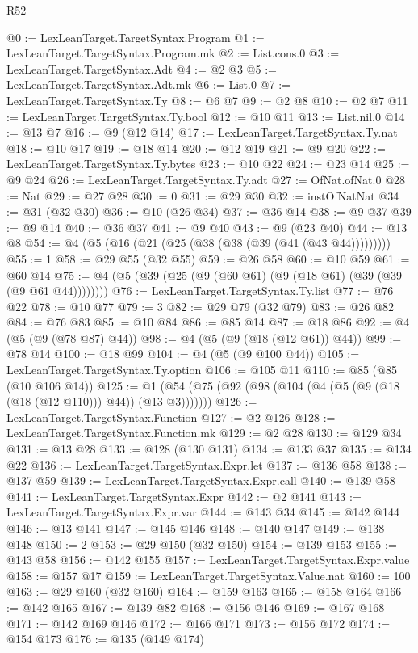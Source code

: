 \begin{lexlean}{R52}
\begin{coremodule}
{{{{{{{{{{{{{{{{{{{{{{{{{{{{{{{{{{{{{{{{{{{{{{{{{{{{{{{{{{{{{{{{{{{{{{{{{{{{{{{{{{{{{{{{{{{{{{{{{{{{{{{{{{{{{{{{{{{{{{{{{{{{{{{{{{{{{{{{{{{{{{{{{{{{{{{{{{{{{{{{{{{{{{{{{{{{{{{{{{{{{{{{{{{{{{{{{{{{{{@0 := LexLeanTarget.TargetSyntax.Program
@1 := LexLeanTarget.TargetSyntax.Program.mk
@2 := List.cons.{0}
@3 := LexLeanTarget.TargetSyntax.Adt
@4 := @2 @3
@5 := LexLeanTarget.TargetSyntax.Adt.mk
@6 := List.{0}
@7 := LexLeanTarget.TargetSyntax.Ty
@8 := @6 @7
@9 := @2 @8
@10 := @2 @7
@11 := LexLeanTarget.TargetSyntax.Ty.bool
@12 := @10 @11
@13 := List.nil.{0}
@14 := @13 @7
@16 := @9 (@12 @14)
@17 := LexLeanTarget.TargetSyntax.Ty.nat
@18 := @10 @17
@19 := @18 @14
@20 := @12 @19
@21 := @9 @20
@22 := LexLeanTarget.TargetSyntax.Ty.bytes
@23 := @10 @22
@24 := @23 @14
@25 := @9 @24
@26 := LexLeanTarget.TargetSyntax.Ty.adt
@27 := OfNat.ofNat.{0}
@28 := Nat
@29 := @27 @28
@30 := 0
@31 := @29 @30
@32 := instOfNatNat
@34 := @31 (@32 @30)
@36 := @10 (@26 @34)
@37 := @36 @14
@38 := @9 @37
@39 := @9 @14
@40 := @36 @37
@41 := @9 @40
@43 := @9 (@23 @40)
@44 := @13 @8
@54 := @4 (@5 (@16 (@21 (@25 (@38 (@38 (@39 (@41 (@43 @44)))))))))
@55 := 1
@58 := @29 @55 (@32 @55)
@59 := @26 @58
@60 := @10 @59
@61 := @60 @14
@75 := @4 (@5 (@39 (@25 (@9 (@60 @61) (@9 (@18 @61) (@39 (@39 (@9 @61 @44))))))))
@76 := LexLeanTarget.TargetSyntax.Ty.list
@77 := @76 @22
@78 := @10 @77
@79 := 3
@82 := @29 @79 (@32 @79)
@83 := @26 @82
@84 := @76 @83
@85 := @10 @84
@86 := @85 @14
@87 := @18 @86
@92 := @4 (@5 (@9 (@78 @87) @44))
@98 := @4 (@5 (@9 (@18 (@12 @61)) @44))
@99 := @78 @14
@100 := @18 @99
@104 := @4 (@5 (@9 @100 @44))
@105 := LexLeanTarget.TargetSyntax.Ty.option
@106 := @105 @11
@110 := @85 (@85 (@10 @106 @14))
@125 := @1 (@54 (@75 (@92 (@98 (@104 (@4 (@5 (@9 (@18 (@18 (@12 @110))) @44)) (@13 @3)))))))
@126 := LexLeanTarget.TargetSyntax.Function
@127 := @2 @126
@128 := LexLeanTarget.TargetSyntax.Function.mk
@129 := @2 @28
@130 := @129 @34
@131 := @13 @28
@133 := @128 (@130 @131)
@134 := @133 @37
@135 := @134 @22
@136 := LexLeanTarget.TargetSyntax.Expr.let
@137 := @136 @58
@138 := @137 @59
@139 := LexLeanTarget.TargetSyntax.Expr.call
@140 := @139 @58
@141 := LexLeanTarget.TargetSyntax.Expr
@142 := @2 @141
@143 := LexLeanTarget.TargetSyntax.Expr.var
@144 := @143 @34
@145 := @142 @144
@146 := @13 @141
@147 := @145 @146
@148 := @140 @147
@149 := @138 @148
@150 := 2
@153 := @29 @150 (@32 @150)
@154 := @139 @153
@155 := @143 @58
@156 := @142 @155
@157 := LexLeanTarget.TargetSyntax.Expr.value
@158 := @157 @17
@159 := LexLeanTarget.TargetSyntax.Value.nat
@160 := 100
@163 := @29 @160 (@32 @160)
@164 := @159 @163
@165 := @158 @164
@166 := @142 @165
@167 := @139 @82
@168 := @156 @146
@169 := @167 @168
@171 := @142 @169 @146
@172 := @166 @171
@173 := @156 @172
@174 := @154 @173
@176 := @135 (@149 @174)
}}}}}}}}}}}}}}}}}}}}}}}}}}}}}}}}}}}}}}}}}}}}}}}}}}}}}}}}}}}}}}}}}}}}}}}}}}}}}}}}}}}}}}}}}}}}}}}}}}}}}}}}}}}}}}}}}}}}}}}}}}}}}}}}}}}}}}}}}}}}}}}}}}}}}}}}}}}}}}}}}}}}}}}}}}}}}}}}}}}}}}}}}}}}}}}}}}}}}}
\end{coremodule}
\end{lexlean}
